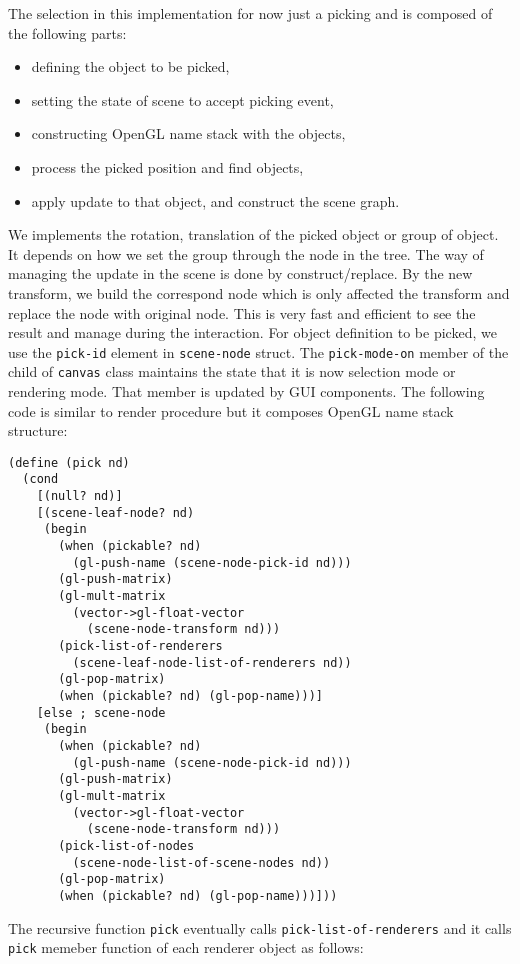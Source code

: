\documentclass[preprint,nocopyrightspace]{sigplanconf}
\begin{document}
The selection in this implementation for now just a picking and is composed of the following parts:
\begin{itemize}
\item defining the object to be picked,
\item setting the state of scene to accept picking event,
\item constructing OpenGL name stack with the objects,
\item process the picked position and find objects,
\item apply update to that object, and construct the scene graph.
\end{itemize}
We implements the rotation, translation of the picked object or group of object. It depends on how we set the group through the node in the tree.
The way of managing the update in the scene is done by construct/replace. By the new transform, we build the correspond node which is only affected the transform and replace the node with original node. This is very fast and efficient to see the result and manage during the interaction. For object definition to be picked, we use the {\tt pick-id} element in {\tt scene-node} struct. The {\tt pick-mode-on} member of the child of {\tt canvas} class maintains the state that it is now selection mode or rendering mode. That member is updated by GUI components. The following code is similar to {render} procedure but it composes OpenGL name stack structure:
\begin{verbatim}
(define (pick nd)
  (cond 
    [(null? nd)]
    [(scene-leaf-node? nd)
     (begin 
       (when (pickable? nd) 
         (gl-push-name (scene-node-pick-id nd)))
       (gl-push-matrix)
       (gl-mult-matrix 
         (vector->gl-float-vector 
           (scene-node-transform nd)))
       (pick-list-of-renderers 
         (scene-leaf-node-list-of-renderers nd))
       (gl-pop-matrix)
       (when (pickable? nd) (gl-pop-name)))]
    [else ; scene-node
     (begin 
       (when (pickable? nd) 
         (gl-push-name (scene-node-pick-id nd)))
       (gl-push-matrix)
       (gl-mult-matrix 
         (vector->gl-float-vector 
           (scene-node-transform nd)))
       (pick-list-of-nodes 
         (scene-node-list-of-scene-nodes nd))
       (gl-pop-matrix)
       (when (pickable? nd) (gl-pop-name)))]))
\end{verbatim}

The recursive function {\tt pick} eventually calls {\tt pick-list-of-renderers}
and it calls {\tt pick} memeber function of each renderer object as follows:
\end{document}
